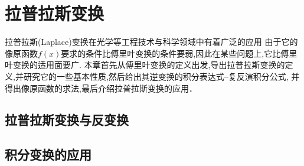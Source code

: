 \chapter{拉普拉斯变换}
拉普拉斯(Laplace)变换在光学等工程技术与科学领域中有着广泛的应用
% 
由于它的像原函数$f(x)$要求的条件比傅里叶变换的条件要弱,因此在某些问题上,它比傅里叶变换的适用面要广.
本章首先从傅里叶变换的定义出发,导出拉普拉斯变换的定义,并研究它的一些基本性质,然后给出其逆变换的积分表达式--复反演积分公式,
并得出像原函数的求法,最后介绍拉普拉斯变换的应用．
\section{拉普拉斯变换与反变换}
\label{sec:laplace_transform_and_inverse_transform}



\section{积分变换的应用}
\label{sec:integral_transform_applications}
